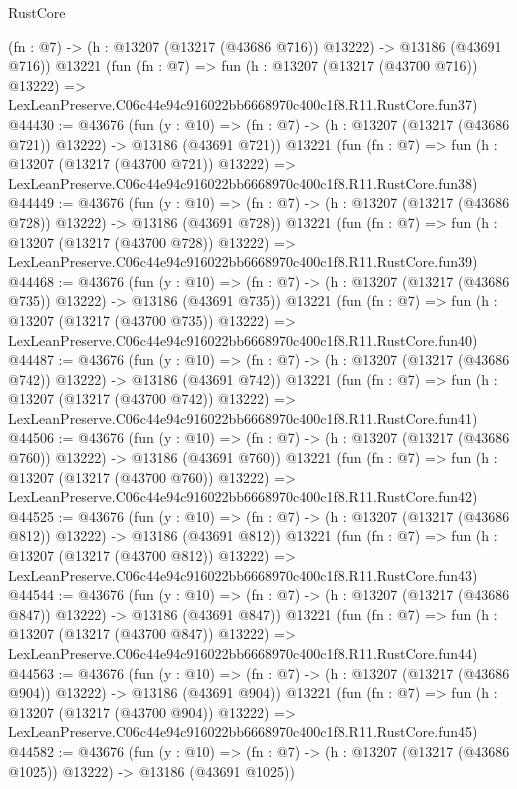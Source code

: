 \begin{lexlean}{RustCore}
\begin{coremodule}
    (fn : @7) -> (h : @13207 (@13217 (@43686 @716)) @13222) -> @13186 (@43691 @716))
    @13221
    (fun (fn : @7) =>
    fun (h : @13207 (@13217 (@43700 @716)) @13222) =>
    LexLeanPreserve.C06c44e94c916022bb6668970c400c1f8.R11.RustCore.fun37)
@44430 := @43676
    (fun (y : @10) =>
    (fn : @7) -> (h : @13207 (@13217 (@43686 @721)) @13222) -> @13186 (@43691 @721))
    @13221
    (fun (fn : @7) =>
    fun (h : @13207 (@13217 (@43700 @721)) @13222) =>
    LexLeanPreserve.C06c44e94c916022bb6668970c400c1f8.R11.RustCore.fun38)
@44449 := @43676
    (fun (y : @10) =>
    (fn : @7) -> (h : @13207 (@13217 (@43686 @728)) @13222) -> @13186 (@43691 @728))
    @13221
    (fun (fn : @7) =>
    fun (h : @13207 (@13217 (@43700 @728)) @13222) =>
    LexLeanPreserve.C06c44e94c916022bb6668970c400c1f8.R11.RustCore.fun39)
@44468 := @43676
    (fun (y : @10) =>
    (fn : @7) -> (h : @13207 (@13217 (@43686 @735)) @13222) -> @13186 (@43691 @735))
    @13221
    (fun (fn : @7) =>
    fun (h : @13207 (@13217 (@43700 @735)) @13222) =>
    LexLeanPreserve.C06c44e94c916022bb6668970c400c1f8.R11.RustCore.fun40)
@44487 := @43676
    (fun (y : @10) =>
    (fn : @7) -> (h : @13207 (@13217 (@43686 @742)) @13222) -> @13186 (@43691 @742))
    @13221
    (fun (fn : @7) =>
    fun (h : @13207 (@13217 (@43700 @742)) @13222) =>
    LexLeanPreserve.C06c44e94c916022bb6668970c400c1f8.R11.RustCore.fun41)
@44506 := @43676
    (fun (y : @10) =>
    (fn : @7) -> (h : @13207 (@13217 (@43686 @760)) @13222) -> @13186 (@43691 @760))
    @13221
    (fun (fn : @7) =>
    fun (h : @13207 (@13217 (@43700 @760)) @13222) =>
    LexLeanPreserve.C06c44e94c916022bb6668970c400c1f8.R11.RustCore.fun42)
@44525 := @43676
    (fun (y : @10) =>
    (fn : @7) -> (h : @13207 (@13217 (@43686 @812)) @13222) -> @13186 (@43691 @812))
    @13221
    (fun (fn : @7) =>
    fun (h : @13207 (@13217 (@43700 @812)) @13222) =>
    LexLeanPreserve.C06c44e94c916022bb6668970c400c1f8.R11.RustCore.fun43)
@44544 := @43676
    (fun (y : @10) =>
    (fn : @7) -> (h : @13207 (@13217 (@43686 @847)) @13222) -> @13186 (@43691 @847))
    @13221
    (fun (fn : @7) =>
    fun (h : @13207 (@13217 (@43700 @847)) @13222) =>
    LexLeanPreserve.C06c44e94c916022bb6668970c400c1f8.R11.RustCore.fun44)
@44563 := @43676
    (fun (y : @10) =>
    (fn : @7) -> (h : @13207 (@13217 (@43686 @904)) @13222) -> @13186 (@43691 @904))
    @13221
    (fun (fn : @7) =>
    fun (h : @13207 (@13217 (@43700 @904)) @13222) =>
    LexLeanPreserve.C06c44e94c916022bb6668970c400c1f8.R11.RustCore.fun45)
@44582 := @43676
    (fun (y : @10) =>
    (fn : @7) -> (h : @13207 (@13217 (@43686 @1025)) @13222) -> @13186 (@43691 @1025))

\end{coremodule}
\end{lexlean}
